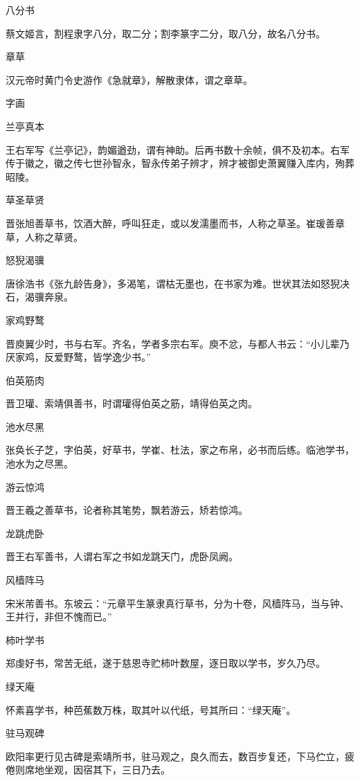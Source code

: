 \documentclass[a4paper,12pt,UTF8,twoside]{ctexbook}
\begin{document}
    八分书
    
    蔡文姬言，割程隶字八分，取二分；割李篆字二分，取八分，故名八分书。
    
    章草
    
    汉元帝时黄门令史游作《急就章》，解散隶体，谓之章草。
    
    字画
    
    兰亭真本
    
    王右军写《兰亭记》，韵媚遒劲，谓有神助。后再书数十余帧，俱不及初本。右军传于徽之，徽之传七世孙智永，智永传弟子辨才，辨才被御史萧翼赚入库内，殉葬昭陵。
    
    草圣草贤
    
    晋张旭善草书，饮酒大醉，呼叫狂走，或以发濡墨而书，人称之草圣。崔瑗善章草，人称之草贤。
    
    怒猊渴骥
    
    唐徐浩书《张九龄告身》，多渴笔，谓枯无墨也，在书家为难。世状其法如怒猊决石，渴骥奔泉。
    
    家鸡野鹜
    
    晋庾翼少时，书与右军。齐名，学者多宗右军。庾不忿，与都人书云：“小儿辈乃厌家鸡，反爱野鹜，皆学逸少书。”
    
    伯英筋肉
    
    晋卫瓘、索靖俱善书，时谓瓘得伯英之筋，靖得伯英之肉。
    
    池水尽黑
    
    张奂长子芝，字伯英，好草书，学崔、杜法，家之布帛，必书而后练。临池学书，池水为之尽黑。
    
    游云惊鸿
    
    晋王羲之善草书，论者称其笔势，飘若游云，矫若惊鸿。
    
    龙跳虎卧
    
    晋王右军善书，人谓右军之书如龙跳天门，虎卧凤阙。
    
    风樯阵马
    
    宋米芾善书。东坡云：“元章平生篆隶真行草书，分为十卷，风樯阵马，当与钟、王并行，非但不愧而已。”
    
    柿叶学书
    
    郑虔好书，常苦无纸，遂于慈恩寺贮柿叶数屋，逐日取以学书，岁久乃尽。
    
    绿天庵
    
    怀素喜学书，种芭蕉数万株，取其叶以代纸，号其所曰：“绿天庵”。
    
    驻马观碑
    
    欧阳率更行见古碑是索靖所书，驻马观之，良久而去，数百步复还，下马伫立，疲倦则席地坐观，因宿其下，三日乃去。
    
\end{document}
